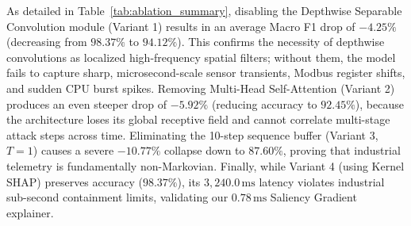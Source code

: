 \documentclass[11pt,a4paper]{article}
\begin{document}
\begin{table}[!htbp]
\centering
\caption{Systematic Architectural Ablation Study: Quantitative Impact of Core Neural Component Removals on Classification Performance and Mitigation Feasibility}
\label{tab:ablation_summary}
\end{table}

As detailed in Table~\ref{tab:ablation_summary}, disabling the Depthwise Separable Convolution module (Variant 1) results in an average Macro F1 drop of $-4.25\%$ (decreasing from $98.37\%$ to $94.12\%$). This confirms the necessity of depthwise convolutions as localized high-frequency spatial filters; without them, the model fails to capture sharp, microsecond-scale sensor transients, Modbus register shifts, and sudden CPU burst spikes. Removing Multi-Head Self-Attention (Variant 2) produces an even steeper drop of $-5.92\%$ (reducing accuracy to $92.45\%$), because the architecture loses its global receptive field and cannot correlate multi-stage attack steps across time. Eliminating the 10-step sequence buffer (Variant 3, $T=1$) causes a severe $-10.77\%$ collapse down to $87.60\%$, proving that industrial telemetry is fundamentally non-Markovian. Finally, while Variant 4 (using Kernel SHAP) preserves accuracy ($98.37\%$), its $3,240.0\,\text{ms}$ latency violates industrial sub-second containment limits, validating our $0.78\,\text{ms}$ Saliency Gradient explainer.
\end{document}
